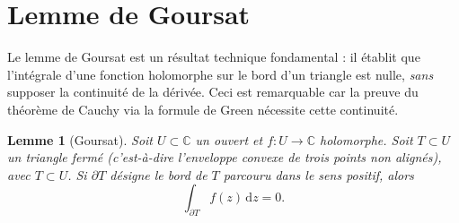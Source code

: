 \documentclass[12pt,a4paper,openany]{book}
\theoremstyle{definition}
\theoremstyle{plain}
\newtheorem{lemme}[definition]{Lemme}
\theoremstyle{remark}
\newcommand{\C}{\mathbb{C}}
\newcommand{\dd}{\mathrm{d}}
\begin{document}
\section{Lemme de Goursat}\label{sec:goursat}

Le lemme de Goursat est un résultat technique fondamental : il établit que
l'intégrale d'une fonction holomorphe sur le bord d'un triangle est nulle,
\emph{sans} supposer la continuité de la dérivée. Ceci est remarquable car
la preuve du théorème de Cauchy via la formule de Green nécessite cette
continuité.

\begin{lemme}[Goursat]\label{lem:goursat}
Soit $U \subset \C$ un ouvert et $f \colon U \to \C$ holomorphe. Soit
$T \subset U$ un triangle fermé (c'est-à-dire l'enveloppe convexe de trois
points non alignés), avec $T \subset U$. Si $\partial T$ désigne le bord
de $T$ parcouru dans le sens positif, alors
\[
  \int_{\partial T} f(z) \, \dd z = 0.
\]
\end{lemme}
\end{document}
